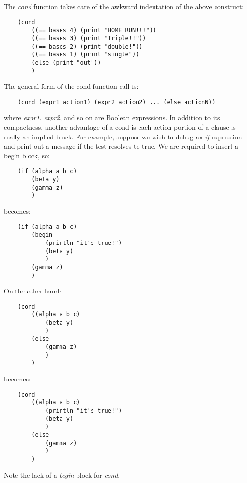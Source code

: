 The {\it cond} function takes care  of the awkward indentation
of the above construct:

\begin{verbatim}
    (cond
        ((== bases 4) (print "HOME RUN!!!"))
        ((== bases 3) (print "Triple!!"))
        ((== bases 2) (print "double!"))
        ((== bases 1) (print "single"))
        (else (print "out"))
        )
\end{verbatim}

The general form of the cond function call is:

\begin{verbatim}
    (cond (expr1 action1) (expr2 action2) ... (else actionN))
\end{verbatim}

where {\it expr1}, {\it expr2}, and so on are Boolean expressions. In addition
to its compactness, another advantage of a cond is each action
portion of a clause is really an implied block. For example,
suppose we wish to debug an {\it if} expression and print out a
message if the test resolves to true. We are required to insert
a begin block, so:

\begin{verbatim}
    (if (alpha a b c)
        (beta y)
        (gamma z)
        )
\end{verbatim}

becomes:

\begin{verbatim}
    (if (alpha a b c)
        (begin
            (println "it's true!")
            (beta y)
            )
        (gamma z)
        )
\end{verbatim}

On the other hand:

\begin{verbatim}
    (cond
        ((alpha a b c)
            (beta y)
            )
        (else
            (gamma z)
            )
        )
\end{verbatim}

becomes:

\begin{verbatim}
    (cond
        ((alpha a b c)
            (println "it's true!")
            (beta y)
            )
        (else
            (gamma z)
            )
        )
\end{verbatim}

Note the lack of a {\it begin} block for {\it cond}.
